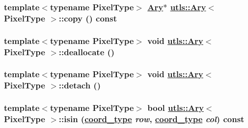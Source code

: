\hypertarget{structutls_1_1Ary_5a5a2f509832fb8cce2470f2cb5e3eaa}{
\subsubsection[copy]{\setlength{\rightskip}{0pt plus 5cm}template$<$typename Pixel\-Type$>$ \hyperlink{structutls_1_1Ary}{Ary}$\ast$ \hyperlink{structutls_1_1Ary}{utls::Ary}$<$ Pixel\-Type $>$::copy () const}}
\label{structutls_1_1Ary_5a5a2f509832fb8cce2470f2cb5e3eaa}


\hypertarget{structutls_1_1Ary_c3fc175e7c69a1702961f4036019160d}{
\subsubsection[deallocate]{\setlength{\rightskip}{0pt plus 5cm}template$<$typename Pixel\-Type$>$ void \hyperlink{structutls_1_1Ary}{utls::Ary}$<$ Pixel\-Type $>$::deallocate ()}}
\label{structutls_1_1Ary_c3fc175e7c69a1702961f4036019160d}


\hypertarget{structutls_1_1Ary_bccc51fad2fc93d1882f94fad6017017}{
\subsubsection[detach]{\setlength{\rightskip}{0pt plus 5cm}template$<$typename Pixel\-Type$>$ void \hyperlink{structutls_1_1Ary}{utls::Ary}$<$ Pixel\-Type $>$::detach ()}}
\label{structutls_1_1Ary_bccc51fad2fc93d1882f94fad6017017}


\hypertarget{structutls_1_1Ary_881effb705efcaf470dee372be3f3353}{
\subsubsection[isin]{\setlength{\rightskip}{0pt plus 5cm}template$<$typename Pixel\-Type$>$ bool \hyperlink{structutls_1_1Ary}{utls::Ary}$<$ Pixel\-Type $>$::isin (\hyperlink{structutls_1_1Ary_907420b899d180bd0ae87c3995316f18}{coord\_\-type} {\em row}, \hyperlink{structutls_1_1Ary_907420b899d180bd0ae87c3995316f18}{coord\_\-type} {\em col}) const}}
\label{structutls_1_1Ary_881effb705efcaf470dee372be3f3353}


